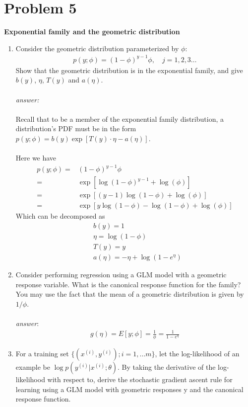 \documentclass{article}
\begin{document}
\section{Problem 5}
\textbf{Exponential family and the geometric distribution}\\
\begin{enumerate}[label=(\alph*)]
    \item Consider the geometric distribution parameterized by $\phi$:\begin{align*}
        p(y;\phi)=(1-\phi)^{y-1}\phi, \quad j=1,2,3\dots
    \end{align*}Show that the geometric distribution is in the exponential family, and give $b(y)$, $\eta$, $T(y)$ and $a(\eta)$.\\\\
    \textit{answer:}\\\\
    Recall that to be a member of the exponential family distribution, a distribution's PDF must be in the form $p(y;\phi ) = b(y)\exp[T(y)\cdot \eta-a(\eta)]$. \\\\Here we have
    \begin{align*}
        p(y;\phi)=&(1-\phi)^{y-1}\phi\\
        =&\exp[\log(1-\phi)^{y-1} + \log(\phi)]\\
        =&\exp[(y-1)\log(1-\phi) + \log(\phi)]\\
        =&\exp[y\log (1-\phi)-\log(1-\phi)+\log(\phi)]
    \end{align*}Which can be decomposed as\begin{align*}
        &b(y)=1\\
        &\eta = \log (1-\phi)\\
        &T(y) = y\\
        &a(\eta)=-\eta +\log (1-e^\eta)
    \end{align*}
    \item Consider performing regression using a GLM model with a geometric response variable. What is the canonical response function for the family? You may use the fact that the mean of a geometric distribution is given by $1/\phi$.\\\\
    \textit{answer}:\begin{align*}
        g(\eta) = E[y;\phi ] = \frac{1}{\phi } = \frac{1}{1-e^\eta}
    \end{align*}
    \item For a training set $\{(x^{(i)}, y^{(i)}); i=1,\dots m\}$, let the log-likelihood of an example be $\log p(y^{(i)}|x^{(i)};\theta)$. By taking the derivative of the log-likelihood with respect to, derive the stochastic gradient ascent rule for learning using a GLM model with geometric responses y and the canonical response function.\\\\

\end{enumerate}
\end{document}
